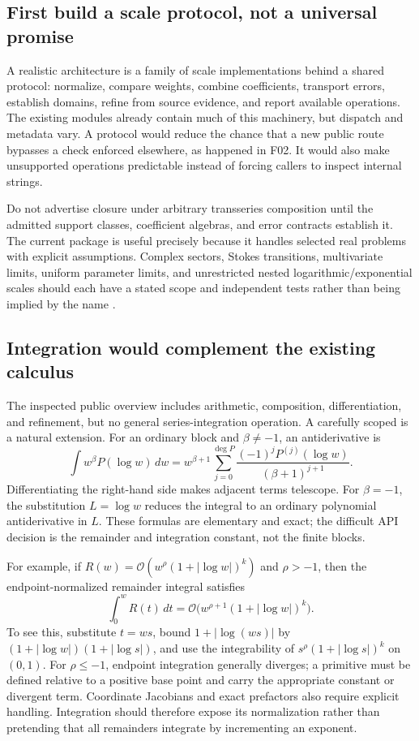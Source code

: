 \documentclass[11pt,a4paper]{article}
\newcommand{\code}[1]{\texttt{\detokenize{#1}}}
\newcommand{\OO}{\mathcal O}
\begin{document}
\subsection{First build a scale protocol, not a universal promise}
A realistic architecture is a family of scale implementations behind a shared protocol: normalize, compare weights, combine coefficients, transport errors, establish domains, refine from source evidence, and report available operations. The existing modules already contain much of this machinery, but dispatch and metadata vary. A protocol would reduce the chance that a new public route bypasses a check enforced elsewhere, as happened in F02. It would also make unsupported operations predictable instead of forcing callers to inspect internal \code{Kind} strings.\cite{repo-operations,repo-arithmetic,repo-envelope}

Do not advertise closure under arbitrary transseries composition until the admitted support classes, coefficient algebras, and error contracts establish it. The current package is useful precisely because it handles selected real problems with explicit assumptions. Complex sectors, Stokes transitions, multivariate limits, uniform parameter limits, and unrestricted nested logarithmic/exponential scales should each have a stated scope and independent tests rather than being implied by the name \code{GeneralizedSeries}.

\subsection{Integration would complement the existing calculus}
The inspected public overview includes arithmetic, composition, differentiation, and refinement, but no general series-integration operation. A carefully scoped \code{SeriesIntegrate} is a natural extension. For an ordinary block and \(\beta\ne-1\), an antiderivative is
\[
\int w^\beta P(\log w)\,dw
=
 w^{\beta+1}
 \sum_{j=0}^{\deg P}
 \frac{(-1)^jP^{(j)}(\log w)}{(\beta+1)^{j+1}}.
\]
Differentiating the right-hand side makes adjacent terms telescope. For \(\beta=-1\), the substitution \(L=\log w\) reduces the integral to an ordinary polynomial antiderivative in \(L\). These formulas are elementary and exact; the difficult API decision is the remainder and integration constant, not the finite blocks.\cite{repo-guide}

For example, if \(R(w)=\OO(w^\rho(1+|\log w|)^k)\) and \(\rho>-1\), then the endpoint-normalized remainder integral satisfies
\[
\int_0^w R(t)\,dt
=\OO\bigl(w^{\rho+1}(1+|\log w|)^k\bigr).
\]
To see this, substitute \(t=ws\), bound \(1+|\log(ws)|\) by \((1+|\log w|)(1+|\log s|)\), and use the integrability of \(s^\rho(1+|\log s|)^k\) on \((0,1)\). For \(\rho\le-1\), endpoint integration generally diverges; a primitive must be defined relative to a positive base point and carry the appropriate constant or divergent term. Coordinate Jacobians and exact prefactors also require explicit handling. Integration should therefore expose its normalization rather than pretending that all remainders integrate by incrementing an exponent.
\end{document}
